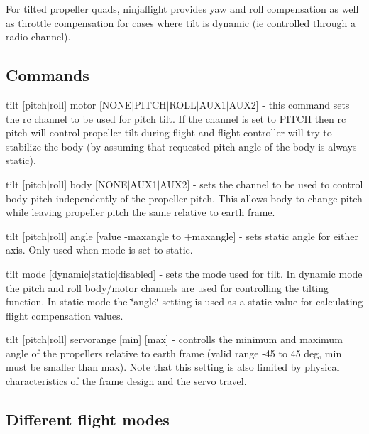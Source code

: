 For tilted propeller quads, ninjaflight provides yaw and roll compensation as well as throttle compensation for cases where tilt is dynamic (ie controlled through a radio channel).

\subsection*{Commands }


\begin{DoxyItemize}
\item tilt \mbox{[}pitch$\vert$roll\mbox{]} motor \mbox{[}N\+O\+N\+E$\vert$\+P\+I\+T\+C\+H$\vert$\+R\+O\+L\+L$\vert$\+A\+U\+X1$\vert$\+A\+U\+X2\mbox{]} -\/ this command sets the rc channel to be used for pitch tilt. If the channel is set to P\+I\+T\+C\+H then rc pitch will control propeller tilt during flight and flight controller will try to stabilize the body (by assuming that requested pitch angle of the body is always static).
\item tilt \mbox{[}pitch$\vert$roll\mbox{]} body \mbox{[}N\+O\+N\+E$\vert$\+A\+U\+X1$\vert$\+A\+U\+X2\mbox{]} -\/ sets the channel to be used to control body pitch independently of the propeller pitch. This allows body to change pitch while leaving propeller pitch the same relative to earth frame.
\item tilt \mbox{[}pitch$\vert$roll\mbox{]} angle \mbox{[}value -\/maxangle to +maxangle\mbox{]} -\/ sets static angle for either axis. Only used when mode is set to static.
\item tilt mode \mbox{[}dynamic$\vert$static$\vert$disabled\mbox{]} -\/ sets the mode used for tilt. In dynamic mode the pitch and roll body/motor channels are used for controlling the tilting function. In static mode the \char`\"{}angle\char`\"{} setting is used as a static value for calculating flight compensation values.
\item tilt \mbox{[}pitch$\vert$roll\mbox{]} servorange \mbox{[}min\mbox{]} \mbox{[}max\mbox{]} -\/ controlls the minimum and maximum angle of the propellers relative to earth frame (valid range -\/45 to 45 deg, min must be smaller than max). Note that this setting is also limited by physical characteristics of the frame design and the servo travel.
\end{DoxyItemize}

\subsection*{Different flight modes }

